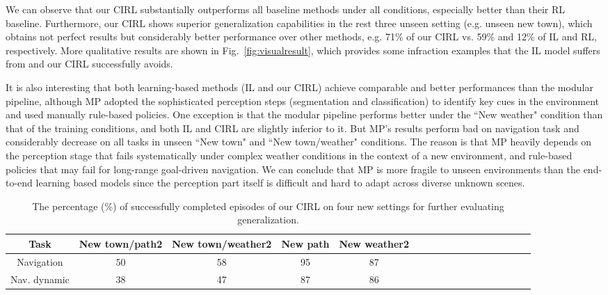 \documentclass[runningheads]{llncs}
\begin{document}
We can observe that our CIRL substantially outperforms all baseline methods under all conditions, especially better than their RL baseline. Furthermore, our CIRL shows superior generalization capabilities in the rest three unseen setting (e.g. unseen new town), which obtains not perfect results but considerably better performance over other methods, e.g. 71\% of our CIRL vs. 59\% and 12\% of IL and RL, respectively. More qualitative results are shown in Fig.~\ref{fig:visualresult}, which provides some infraction examples that the IL model suffers from and our CIRL successfully avoids. 

It is also interesting that both learning-based methods (IL and our CIRL) achieve comparable and better performances than the modular pipeline, although MP adopted the  sophisticated perception steps (segmentation and classification) to identify key cues in the environment and used manually rule-based policies. One exception is that the modular pipeline performs better under the ``New weather" condition than that of the training conditions, and both IL and CIRL are slightly inferior to it. But MP's results perform bad on navigation task and considerably decrease on all tasks in unseen ``New town" and ``New town/weather" conditions. The reason is that MP heavily depends on the perception stage that fails systematically under complex weather conditions in the context of a new environment, and rule-based policies that may fail for long-range goal-driven navigation. We can conclude that MP is more fragile to unseen environments than the end-to-end learning based models since the perception part itself is difficult and hard to adapt across diverse unknown scenes.

\begin{table}[t]
\centering
\small
\caption{The percentage (\%) of successfully completed episodes of our CIRL on four new settings for further evaluating generalization.}\vspace{-3mm}
\tabcolsep 0.03in 
\begin{tabular}{c|c|c|c|ccc|cccccc|cccc|}
\toprule[0.1pt]
\multirow{1}{*}{Task}   & \multicolumn{1}{c}{New town/path2} & \multicolumn{1}{c}{New town/weather2} & \multicolumn{1}{c}{New path} & \multicolumn{1}{c}{New weather2} \\ %
\hline               
Navigation  &50 & 58 & 95 & 87\\
Nav. dynamic & 38 & 47 & 87 & 86\\
\toprule[0.7pt]
\end{tabular}\vspace{-4mm}
\label{tab: results_new}
\end{table}
\end{document}
